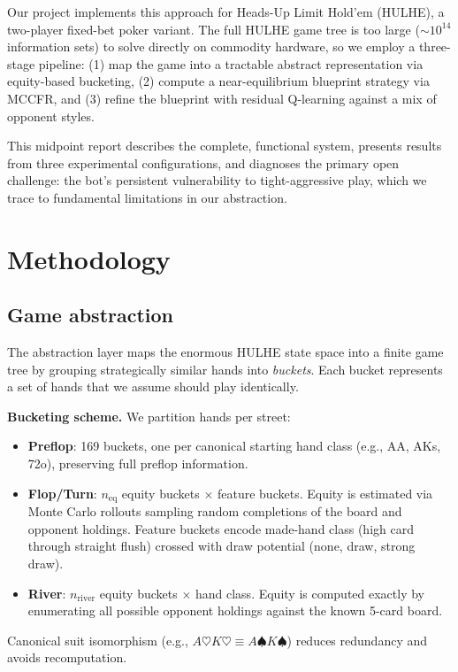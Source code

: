 \documentclass{article}
\begin{document}
Our project implements this approach for Heads-Up Limit Hold'em (HULHE), a two-player fixed-bet poker variant. The full HULHE game tree is too large ($\sim$$10^{14}$ information sets) to solve directly on commodity hardware, so we employ a three-stage pipeline: (1) map the game into a tractable abstract representation via equity-based bucketing, (2) compute a near-equilibrium blueprint strategy via MCCFR, and (3) refine the blueprint with residual Q-learning against a mix of opponent styles.

This midpoint report describes the complete, functional system, presents results from three experimental configurations, and diagnoses the primary open challenge: the bot's persistent vulnerability to tight-aggressive play, which we trace to fundamental limitations in our abstraction.

\section{Methodology}

\subsection{Game abstraction}

The abstraction layer maps the enormous HULHE state space into a finite game tree by grouping strategically similar hands into \textit{buckets}. Each bucket represents a set of hands that we assume should play identically.

\textbf{Bucketing scheme.} We partition hands per street:
\begin{itemize}
    \item \textbf{Preflop}: 169 buckets, one per canonical starting hand class (e.g., AA, AKs, 72o), preserving full preflop information.
    \item \textbf{Flop/Turn}: $n_{\text{eq}}$ equity buckets $\times$ feature buckets. Equity is estimated via Monte Carlo rollouts sampling random completions of the board and opponent holdings. Feature buckets encode made-hand class (high card through straight flush) crossed with draw potential (none, draw, strong draw).
    \item \textbf{River}: $n_{\text{river}}$ equity buckets $\times$ hand class. Equity is computed exactly by enumerating all possible opponent holdings against the known 5-card board.
\end{itemize}

Canonical suit isomorphism (e.g., $A\heartsuit K\heartsuit \equiv A\spadesuit K\spadesuit$) reduces redundancy and avoids recomputation.
\end{document}
